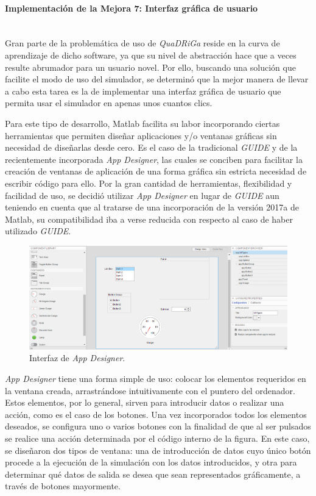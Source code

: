 \paragraph{Implementación de la Mejora 7: Interfaz gráfica de usuario} \mbox{} \\

Gran parte de la problemática de uso de \textit{QuaDRiGa} reside en la curva de aprendizaje de dicho software, ya que su nivel de abstracción hace que a veces resulte abrumador para un usuario novel. Por ello, buscando una solución que facilite el modo de uso del simulador, se determinó que la mejor manera de llevar a cabo esta tarea es la de implementar una interfaz gráfica de usuario que permita usar el simulador en apenas unos cuantos clics.

Para este tipo de desarrollo, Matlab facilita su labor incorporando ciertas herramientas que permiten diseñar aplicaciones y/o ventanas gráficas sin necesidad de diseñarlas desde cero. Es el caso de la tradicional \textit{GUIDE} y de la recientemente incorporada \textit{App Designer}, las cuales se conciben para facilitar la creación de ventanas de aplicación de una forma gráfica sin estricta necesidad de escribir código para ello. Por la gran cantidad de herramientas, flexibilidad y facilidad de uso, se decidió utilizar \textit{App Designer} en lugar de \textit{GUIDE} aun teniendo en cuenta que al tratarse de una incorporación de la versión 2017a de Matlab, su compatibilidad iba a verse reducida con respecto al caso de haber utilizado \textit{GUIDE}.

\begin{figure}[h!]
	\centering
    \includegraphics[width=\linewidth]{imagenes/interfaz_appdesigner.PNG}
	\caption{Interfaz de \textit{App Designer}.}
	\label{fig:appdesigner}
\end{figure}

\textit{App Designer} tiene una forma simple de uso: colocar los elementos requeridos en la ventana creada, arrastrándose intuitivamente con el puntero del ordenador. Estos elementos, por lo general, sirven para introducir datos o realizar una acción, como es el caso de los botones. Una vez incorporados todos los elementos deseados, se configura uno o varios botones con la finalidad de que al ser pulsados se realice una acción determinada por el código interno de la figura. En este caso, se diseñaron dos tipos de ventana: una de introducción de datos cuyo único botón procede a la ejecución de la simulación con los datos introducidos, y otra para determinar qué datos de salida se desea que sean representados gráficamente, a través de botones mayormente.

